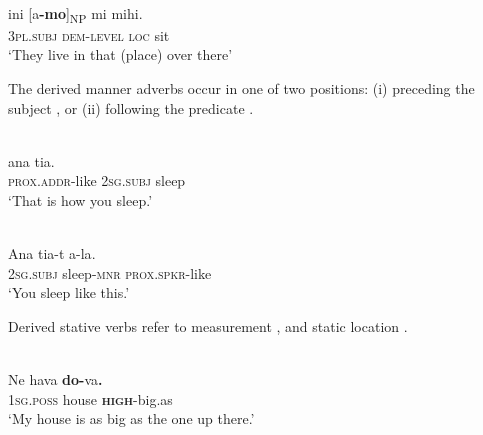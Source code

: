   



  



\ea%
\label{ex:7:16}
 \\
\gll {\textglotstop}ini [{\textglotstop}{a}\textbf{-mo}]\textsubscript{NP} mi   {mihi.}\\
   \textsc{3pl.subj} \textsc{dem-level} \textsc{loc} sit \\
\glt `They live in that (place) over there'
\z

  

 

  

The derived manner adverbs occur in one of two positions: (i) preceding the subject , or (ii) following the predicate .



\ea%
\label{ex:7:17}
 \\
    ana  tia. \\
   \textsc{prox.addr}{}-like  \textsc{2sg.subj} sleep \\
\glt   `That is how you sleep.'
\z



 \ea%
\label{ex:7:18}
 \\
\gll Ana  tia-t  {{\textglotstop}}{a-la}{{\ng}}{.} \\
  \textsc{2sg.subj} sleep-\textsc{mnr} \textsc{prox.spkr}{}-like  \\
\glt   `You sleep like this.'
\z 
 
 



Derived stative verbs refer to measurement , and static location . 



\ea%
\label{ex:7:19}
 \\
\gll  Ne   hava  \textbf{{do-}}{va{\ng}}\textbf{{.}} \\
   \textsc{1sg.poss} house  \textbf{\textsc{high}}\textsc{{}-}big.as  \\
\glt   `My house is as big as the one up there.'
\z









